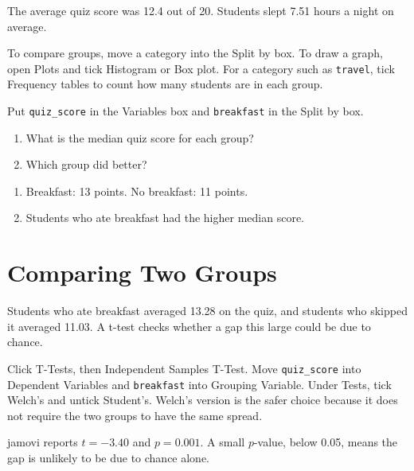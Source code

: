 The average quiz score was 12.4 out of 20. Students slept 7.51 hours a night on average.

To compare groups, move a category into the Split by box. To draw a graph, open Plots and tick Histogram or Box plot. For a category such as \texttt{travel}, tick Frequency tables to count how many students are in each group.


\begin{Exercise}[title={Breakfast and Quiz Scores}, label={ex:jamovi-split}]
Put \texttt{quiz\_score} in the Variables box and \texttt{breakfast} in the Split by box.
\begin{enumerate}
\item What is the median quiz score for each group?
\item Which group did better?
\end{enumerate}
\end{Exercise}
\begin{Answer}[ref={ex:jamovi-split}]
\begin{enumerate}
\item Breakfast: 13 points. No breakfast: 11 points.
\item Students who ate breakfast had the higher median score.
\end{enumerate}
\end{Answer}

\section{Comparing Two Groups}

Students who ate breakfast averaged 13.28 on the quiz, and students who skipped it averaged 11.03. A t-test checks whether a gap this large could be due to chance.

Click T-Tests, then Independent Samples T-Test. Move \texttt{quiz\_score} into Dependent Variables and \texttt{breakfast} into Grouping Variable. Under Tests, tick Welch's and untick Student's. Welch's version is the safer choice because it does not require the two groups to have the same spread.


jamovi reports $t = -3.40$ and $p = 0.001$. A small $p$-value, below 0.05, means the gap is unlikely to be due to chance alone.

